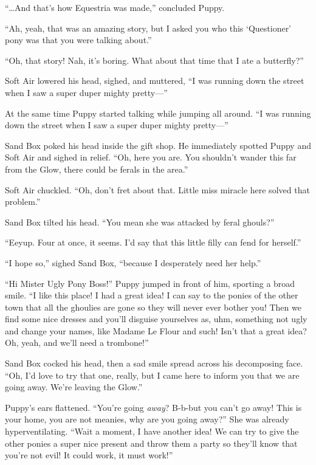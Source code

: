 
``\dots And that's how Equestria was made,'' concluded Puppy.

``Ah, yeah, that was an amazing story, but I asked you who this `Questioner' pony was that you were talking about.''

``Oh, that story! Nah, it's boring. What about that time that I ate a butterfly?''

Soft Air lowered his head, sighed, and muttered, ``I was running down the street when I saw a super duper mighty pretty---''

At the same time Puppy started talking while jumping all around. ``I was running down the street when I saw a super duper mighty pretty---''


\horizonline


Sand Box poked his head inside the gift shop. He immediately spotted Puppy and Soft Air and sighed in relief. ``Oh, here you are. You shouldn't wander this far from the Glow, there could be ferals in the area.''

Soft Air chuckled. ``Oh, don't fret about that. Little miss miracle here solved that problem.''

Sand Box tilted his head. ``You mean she was attacked by feral ghouls?''

``Eeyup. Four at once, it seems. I'd say that this little filly can fend for herself.''

``I hope so,'' sighed Sand Box, ``because I desperately need her help.''

``Hi Mister Ugly Pony Boss!'' Puppy jumped in front of him, sporting a broad smile. ``I like this place! I had a great idea! I can say to the ponies of the other town that all the ghoulies are gone so they will never ever bother you! Then we find some nice dresses and you'll disguise yourselves as, uhm, something not ugly and change your names, like Madame Le Flour and such! Isn't that a great idea? Oh, yeah, and we'll need a trombone!''

Sand Box cocked his head, then a sad smile spread across his decomposing face. ``Oh, I'd love to try that one, really, but I came here to inform you that we are going away. We're leaving the Glow.''

Puppy's ears flattened. ``You're going \emph{away}? B-b-but you can't go away! This is your home, you are not meanies, why are you going away?'' She was already hyperventilating. ``Wait a moment, I have another idea! We can try to give the other ponies a super nice present and throw them a party so they'll know that you're not evil! It could work, it must work!''

